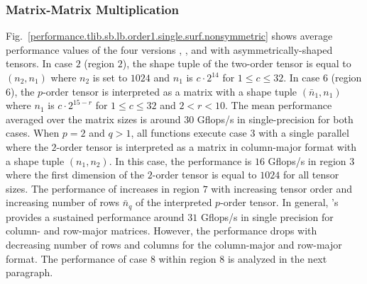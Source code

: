 \subsubsection{Matrix-Matrix Multiplication}
Fig.~\ref{performance.tlib.sb.lb.order1.single.surf.nonsymmetric} shows average performance values of the four versions , ,  and  with asymmetrically-shaped tensors.
In case $2$ (region $2$), the shape tuple of the two-order tensor is equal to $(n_2,n_1)$ where $n_2$ is set to $1024$ and $n_1$ is $c \cdot 2^{14}$ for $1 \leq c \leq 32$. %
In case $6$ (region $6$), the $p$-order tensor is interpreted as a matrix with a shape tuple $(\bar{n}_1,n_1)$ where $n_1$ is $c \cdot 2^{15-r}$ for $1 \leq c \leq 32$ and $2 < r < 10$.
The mean performance averaged over the matrix sizes is around $30$ Gflops/s in single-precision for both cases.
When $p=2$ and $q>1$, all functions execute case $3$ with a single parallel  where the $2$-order tensor is interpreted as a matrix in column-major format with a shape tuple $(n_1,n_2)$.
In this case, the performance is $16$ Gflops/s in region $3$ where the first dimension of the $2$-order tensor is equal to $1024$ for all tensor sizes.
The performance of  increases in region $7$ with increasing tensor order and increasing number of rows $\bar{n}_q$ of the interpreted $p$-order tensor.
In general, 's  provides a sustained performance around $31$ Gflops/s in single precision for column- and row-major matrices.
However, the performance drops with decreasing number of rows and columns for the column-major and row-major format.
The performance of case $8$ within region $8$ is analyzed in the next paragraph.


